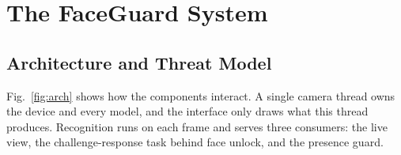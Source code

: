 \documentclass{ieeeaccess}
\begin{document}
\section{The FaceGuard System}\label{sec:system}

\subsection{Architecture and Threat Model}
Fig.~\ref{fig:arch} shows how the components interact. A single camera thread owns the device and every model, and the interface only draws what this thread produces. Recognition runs on each frame and serves three consumers: the live view, the challenge-response task behind face unlock, and the presence guard.
\end{document}
